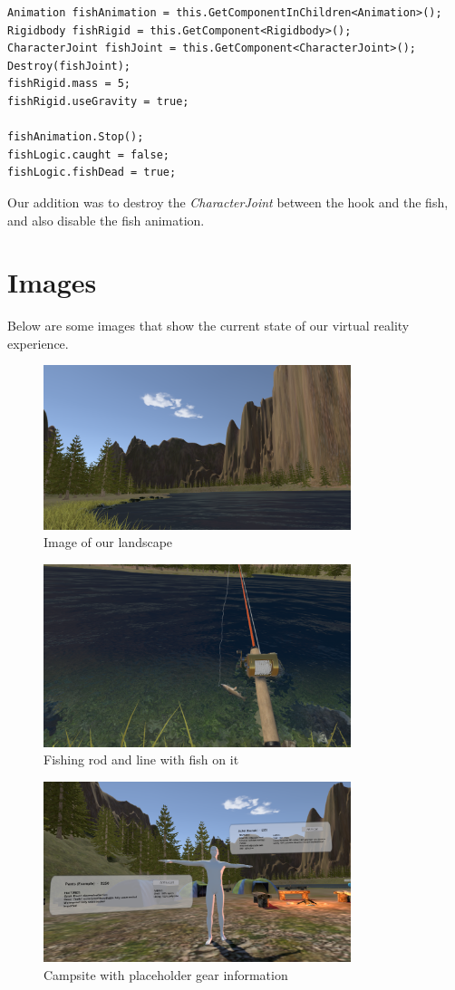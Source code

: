 \documentclass[10pt,journal,compsoc,onecolumn, draftclsnofoot]{IEEEtran}
\begin{document}
\begin{lstlisting}[language={[Sharp]C}]
Animation fishAnimation = this.GetComponentInChildren<Animation>();
Rigidbody fishRigid = this.GetComponent<Rigidbody>();
CharacterJoint fishJoint = this.GetComponent<CharacterJoint>();
Destroy(fishJoint);
fishRigid.mass = 5;
fishRigid.useGravity = true;

fishAnimation.Stop();
fishLogic.caught = false;
fishLogic.fishDead = true;
\end{lstlisting}

Our addition was to destroy the \textit{CharacterJoint} between the hook and the fish, and also disable the fish animation.

\section{Images}
Below are some images that show the current state of our virtual reality experience.

\vspace{1cm}

\begin{figure}[h]
    \centering
    \includegraphics[width=0.80\textwidth]{waterLeft.png}
    \caption{Image of our landscape}
\end{figure}

\begin{figure}[h]
    \centering
    \includegraphics[width=0.8\textwidth]{fishOnLine.png}
    \caption{Fishing rod and line with fish on it}
\end{figure}

\begin{figure}[h]
    \centering
    \includegraphics[width=0.8\textwidth]{gearPrototype.png}
    \caption{Campsite with placeholder gear information}
\end{figure}
\end{document}
